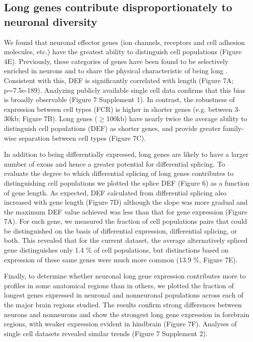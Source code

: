\subsection{Long genes contribute disproportionately to neuronal diversity}

We found that neuronal effector genes (ion channels, receptors and cell adhesion molecules, etc.) have the greatest ability to distinguish cell populations (Figure 4E). Previously, these categories of genes have been found to be selectively enriched in neurons and to share the physical characteristic of being long \citep{Sugino_2014,Gabel_2015,Zylka_2015}. Consistent with this, DEF is significantly correlated with length (Figure 7A; p=7.5e-189). Analyzing publicly available single cell data confirms that this bias is broadly observable (Figure 7 Supplement 1). In contrast, the robustness of expression between cell types (FCR) is higher in shorter genes (e.g. between 3-30kb; Figure 7B). Long genes ($\geq$100kb) have nearly twice the average ability to distinguish cell populations (DEF) as shorter genes, and provide greater family-wise separation between cell types (Figure 7C).  

In addition to being differentially expressed, long genes are likely to have a larger number of exons and hence a greater potential for differential splicing. To evaluate the degree to which differential splicing of long genes contributes to distinguishing cell populations we plotted the splice DEF (Figure 6) as a function of gene length. As expected, DEF calculated from differential splicing also increased with gene length (Figure 7D) although the slope was more gradual and the maximum DEF value achieved was less than that for gene expression (Figure 7A). For each gene, we measured the fraction of cell populations pairs that could be distinguished on the basis of differential expression, differential splicing, or both. This revealed that for the current dataset, the average alternatively spliced gene distinguishes only 1.4 \% of cell populations, but distinctions based on expression of these same genes were much more common (13.9 \%, Figure 7E). 

Finally, to determine whether neuronal long gene expression contributes more to profiles in some anatomical regions than in others, we plotted the fraction of longest genes expressed in neuronal and nonneuronal populations across each of the major brain regions studied. The results confirm strong differences between neurons and nonneurons and show the strongest long gene expression in forebrain regions, with weaker expression evident in hindbrain (Figure 7F). Analyses of single cell datasets revealed similar trends (Figure 7 Supplement 2). 


